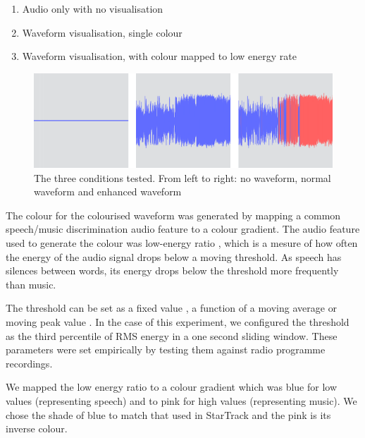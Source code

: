 \begin{enumerate}[label=C\arabic*.]
    \item Audio only with no visualisation
    \item Waveform visualisation, single colour
    \item Waveform visualisation, with colour mapped to low energy rate
\end{enumerate}

\begin{figure}[!h]
\centering
\includegraphics[width=\columnwidth]{figs/conditions-horz.png}
\caption{The three conditions tested. From left to right: no waveform, normal
  waveform and enhanced waveform}
\label{fig:conditions}
\end{figure}

The colour for the colourised waveform was generated by mapping a common speech/music discrimination audio feature to a
colour gradient. The audio feature used to generate the colour was low-energy ratio \citep{Panagiotakis2005}, which is
a mesure of how often the energy of the audio signal drops below a moving threshold. As speech has silences between
words, its energy drops below the threshold more frequently than music.

The threshold can be set as a fixed value \citep{Liang2005}, a function of a moving average \citep{Ericsson2009} or
moving peak value \citep{Saunders1996}.  In the case of this experiment, we configured the threshold as the third
percentile of RMS energy in a one second sliding window. These parameters were set empirically by testing them against
radio programme recordings.

We mapped the low energy ratio to a colour gradient which was blue for low values (representing speech) and to pink
for high values (representing music). We chose the shade of blue to match that used in StarTrack and the pink is
its inverse colour.


